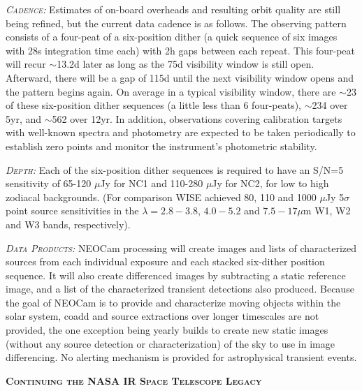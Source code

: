 \documentclass[12pt]{article}
\begin{document}
\smallskip
\smallskip
\noindent
\textsl{\textsc{Cadence:}} Estimates of on-board overheads and resulting orbit quality are still being refined, but the current data cadence is as follows. The observing pattern consists of a four-peat of a six-position dither (a quick sequence of six images with 28s integration time each) with 2h gaps between each repeat. This four-peat will recur $\sim$13.2d later as long as the 75d visibility window is still open. Afterward, there will be a gap of 115d until the next visibility window opens and the pattern begins again. On average in a typical visibility window, there are $\sim$23 of these six-position dither sequences (a little less than 6 four-peats), $\sim$234 over 5yr, and $\sim$562 over 12yr. In addition, observations covering calibration targets with well-known spectra and photometry are expected to be taken periodically to establish zero points and monitor the instrument's photometric stability. 

\smallskip
\smallskip
\noindent
\textsl{\textsc{Depth:}} Each of the six-position dither sequences is required to have an S/N=5 sensitivity of 65-120 $\mu$Jy for NC1 and 110-280 $\mu$Jy for NC2, for low to high zodiacal backgrounds. (For comparison WISE achieved 80, 110 and 1000 $\mu$Jy 5$\sigma$ point source sensitivities in the $\lambda=2.8-3.8$, $4.0-5.2$ and $7.5-17\mu$m W1, W2 and W3 bands, respectively).

\smallskip
\smallskip
\noindent
\textsl{\textsc{Data Products:}} NEOCam processing will create images and lists of characterized sources from each individual exposure and each stacked six-dither position sequence. It will also create differenced images by subtracting a static reference image, and a list of the characterized transient detections also produced. Because the goal of NEOCam is to provide and characterize moving objects within the solar system, coadd and source extractions over longer timescales are not provided, the one exception being yearly builds to create new static images (without any source detection or characterization) of the sky to use in image differencing. No alerting mechanism is provided for astrophysical transient events.  

\smallskip
\smallskip
\noindent
{\bfseries \textsc{\textcolor{Cerulean}{Continuing the NASA IR Space Telescope Legacy}}} 
\end{document}
